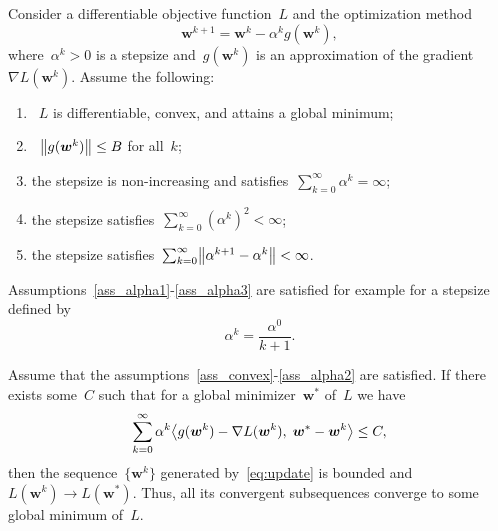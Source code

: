 Consider a differentiable objective function~$L$ and the optimization method
\begin{equation}\label{eq:update}
  \bm{w}^{k+1} = \bm{w}^k - \alpha^k g(\bm{w}^k),
\end{equation}
where~$\alpha^k > 0$ is a stepsize and~$g(\bm{w}^k)$ is an approximation of the gradient~$\nabla L(\bm{w}^k)$. Assume the following:
\begin{enumerate}[label={(\textbf{A\arabic*})}, left = 15pt]
  \item \label{ass_convex}~$L$ is differentiable, convex, and attains a global minimum;
  \item \label{ass_gbound}~$\norm{g(\bm{w}^k)} \leq B$ for all~$k$;
  \item \label{ass_alpha1} the stepsize is non-increasing and satisfies~$\sum_{k=0}^\infty \alpha^k = \infty$;
  \item \label{ass_alpha2} the stepsize satisfies~$\sum_{k=0}^\infty (\alpha^k)^2<\infty$;
  \item \label{ass_alpha3} the stepsize satisfies~$\sum_{k=0}^\infty \norm{\alpha^{k+1}-  \alpha^k}<\infty$.
\end{enumerate}
Assumptions~\ref{ass_alpha1}-\ref{ass_alpha3} are satisfied for example for a stepsize defined by
\begin{equation*}
  \alpha^k = \frac{\alpha^0}{k+1}.
\end{equation*}

\pagebreak

\begin{theorem}\label{thm:convergence}
  Assume that the assumptions~\ref{ass_convex}-\ref{ass_alpha2} are satisfied. If there exists some~$C$ such that for a global minimizer~$\bm{w}^*$ of~$L$ we have
  \begin{equation}\label{eq:nec_cond}
    \sum_{k=0}^\infty \alpha^k \inner{g(\bm{w}^k) - \nabla L(\bm{w}^k)}{\bm{w}^* - \bm{w}^k} \leq C,
  \end{equation}
  then the sequence~$\{\bm{w}^k\}$ generated by~\eqref{eq:update} is bounded and~$L(\bm{w}^k) \to L(\bm{w}^*)$. Thus, all its convergent subsequences converge to some global minimum of~$L$.
\end{theorem}

